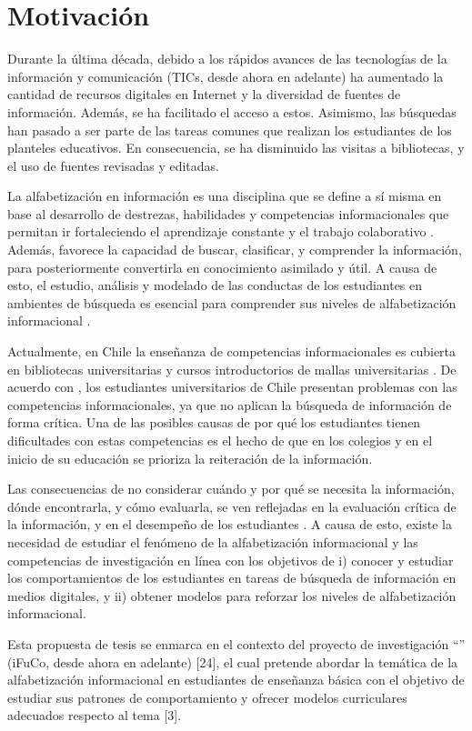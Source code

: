 \section{Motivación}
\label{sec:motivacion}
Durante la última década, debido a los rápidos avances de las tecnologías de la información y comunicación (TICs, desde ahora en adelante) ha aumentado la cantidad de recursos digitales en Internet y la diversidad de fuentes de información. Además, se ha facilitado el acceso a estos. Asimismo, las búsquedas  han pasado a ser parte de las tareas comunes que realizan los estudiantes de los planteles educativos. En consecuencia, se ha disminuido las visitas a bibliotecas, y el uso de fuentes revisadas y editadas.

La alfabetización en información es una disciplina que se define a sí misma en base al desarrollo de destrezas, habilidades y competencias informacionales que permitan ir fortaleciendo el aprendizaje constante y el trabajo colaborativo \parencite{american2000information}. Además, favorece la capacidad de buscar, clasificar, y comprender la información, para posteriormente convertirla en conocimiento asimilado y útil. A causa de esto, el estudio, análisis y modelado de las conductas de los estudiantes en ambientes de búsqueda  es esencial para comprender sus niveles de alfabetización informacional \parencite{tseng2009meta}.

Actualmente, en Chile la enseñanza de competencias informacionales es cubierta en bibliotecas universitarias y cursos introductorios de mallas universitarias \parencite{marzal2015diagnostico}. De acuerdo con \cite{urra2016alfabetizacion}, los estudiantes universitarios de Chile presentan problemas con las competencias informacionales, ya que no aplican la búsqueda de información de forma crítica. Una de las posibles causas de por qué los estudiantes tienen dificultades con estas competencias es el hecho de que en los colegios y en el inicio de su educación se prioriza la reiteración de la información.

Las consecuencias de no considerar cuándo y por qué se necesita la información, dónde encontrarla, y cómo evaluarla, se ven reflejadas en la evaluación crítica de la información, y en el desempeño de los estudiantes \cite{urra2016alfabetizacion}. A causa de esto, existe la necesidad de estudiar el fenómeno de la alfabetización informacional y las competencias de investigación en línea con los objetivos de i) conocer y estudiar los comportamientos de los estudiantes en tareas de búsqueda de información en medios digitales, y ii) obtener modelos para reforzar los niveles de alfabetización informacional.

Esta propuesta de tesis se enmarca en el contexto del proyecto de investigación “” (iFuCo, desde ahora en adelante) [24], el cual pretende abordar la temática de la alfabetización informacional en estudiantes de enseñanza básica con el objetivo de estudiar sus patrones de comportamiento y ofrecer modelos curriculares adecuados respecto al tema [3].

